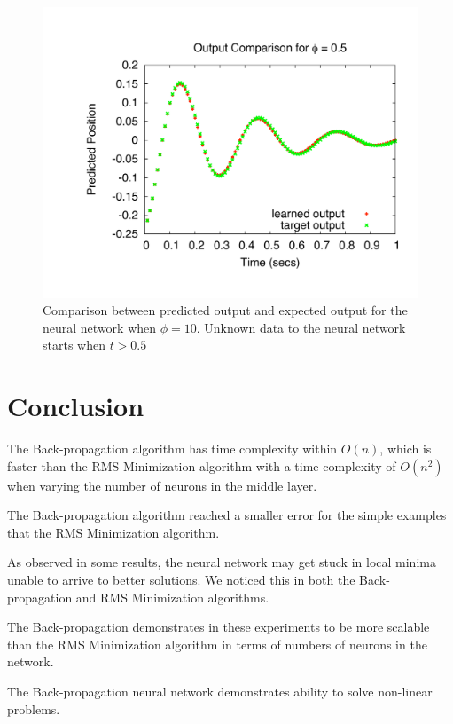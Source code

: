 \documentclass[11pt]{article}
\begin{document}
\begin{figure}[htbp]
	\centering
		\includegraphics[width=0.85\columnwidth]{../bpgt-3.0/damping_test/output_phi.pdf}
	\caption{Comparison between predicted output and expected output for the neural network when $\phi=10$. Unknown data to the neural network starts when $t > 0.5$}
	\label{fig:bpgt-3.0_damping_test_output_phi}
\end{figure}



\section{Conclusion} %
\label{sec:conclusion}

The Back-propagation algorithm has time complexity within $O(n)$, which is faster than the RMS Minimization algorithm with a time
complexity of $O(n^{2})$ when varying the number of neurons in the middle layer. 

The Back-propagation algorithm reached a smaller error for the simple examples that the RMS Minimization algorithm.

As observed in some results, the neural network may get stuck in local minima unable to arrive to better solutions. We noticed this in
both the Back-propagation and RMS Minimization algorithms.

The Back-propagation demonstrates in these experiments to be more scalable than the RMS Minimization algorithm in terms of numbers of
neurons in the network. 

The Back-propagation neural network demonstrates ability to solve non-linear problems.



\end{document}
